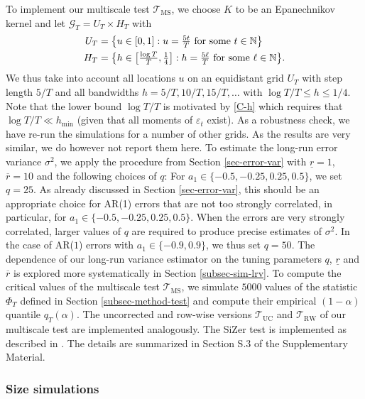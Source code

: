 To implement our multiscale test $\mathcal{T}_{\text{MS}}$, we choose $K$ to be an Epanechnikov kernel and let $\mathcal{G}_T = U_T \times H_T$ with 
\begin{align*}
U_T & = \big\{ u \in [0,1]: u = \textstyle{\frac{5t}{T}} \text{ for some } t \in \mathbb{N} \big\} \\
H_T & = \big\{ h \in \big[ \textstyle{\frac{\log T}{T}}, \textstyle{\frac{1}{4}} \big]:  h = \textstyle{\frac{5\ell}{T}} \text{ for some } \ell \in \mathbb{N} \big\}. 
\end{align*}
We thus take into account all locations $u$ on an equidistant grid $U_T$ with step length $5/T$ and all bandwidths $h=5/T, 10/T, 15/T,\ldots$ with $\log T /T \le h \le 1/4$. Note that the lower bound $\log T / T$ is motivated by \ref{C-h} which requires that $\log T /T \ll h_{\min}$ (given that all moments of $\varepsilon_t$ exist). As a robustness check, we have re-run the simulations for a number of other grids. As the results are very similar, we do however not report them here. 
To estimate the long-run error variance $\sigma^2$, we apply the procedure from Section \ref{sec-error-var} with $\underline{r}=1$, $\overline{r}=10$ and the following choices of $q$: For $a_1 \in \{-0.5,-0.25,0.25,0.5\}$, we set $q = 25$. As already discussed in Section \ref{sec-error-var}, this should be an appropriate choice for AR(1) errors that are not too strongly correlated, in particular, for $a_1 \in \{-0.5,-0.25,0.25,0.5\}$. When the errors are very strongly correlated, larger values of $q$ are required to produce precise estimates of $\sigma^2$. In the case of AR($1$) errors with $a_1 \in \{-0.9,0.9\}$, we thus set $q = 50$. The dependence of our long-run variance estimator on the tuning parameters $q$, $\underline{r}$ and $\overline{r}$ is explored more systematically in Section \ref{subsec-sim-lrv}. 
To compute the critical values of the multiscale test $\mathcal{T}_{\text{MS}}$, we simulate $5000$ values of the statistic $\Phi_T$ defined in Section \ref{subsec-method-test} and compute their empirical $(1-\alpha)$ quantile $q_T(\alpha)$. The uncorrected and row-wise versions $\mathcal{T}_{\text{UC}}$ and $\mathcal{T}_{\text{RW}}$ of our multiscale test are implemented analogously. The SiZer test is implemented as described in \cite{ParkHannigKang2009}. The details are summarized in Section S.3 of the Supplementary Material. 


\subsubsection{Size simulations}\label{subsec-sim-multiscale-size} 


